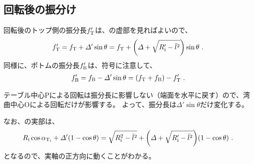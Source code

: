 \subsection{回転後の振分け}
回転後のトップ側の振分長$f_\text T'$は、の虚部を見ればよいので、
\begin{align*}
  f_\text T' = f_\text T+\varDelta'\sin\theta = f_\text T+\left(\varDelta+\sqrt{R_\text i'-\bar l^2}\right)\sin\theta\ .
\end{align*}
同様に、ボトムの振分長$f_\text B'$は、符号に注意して、
\begin{align*}
  f_\text B' = f_\text B-\varDelta'\sin\theta = (f_\text T+f_\text B)-f_\text T'\ .
\end{align*}
\begin{hosokubox}
テーブル中心Pによる回転は振分長に影響しない（端面を水平に戻す）ので、湾曲中心Oによる回転だけが影響する。
よって、振分長は$\varDelta'\sin\theta$だけ変化する。
\end{hosokubox}
なお、の実部は、
\begin{align*}
  R_\text i\cos\alpha_{\text T_\text i}+\varDelta'(1-\cos\theta)
  = \sqrt{R_\text i^2-\bar l^2}+\left(\varDelta+\sqrt{R_\text i'-\bar l^2}\right)\!(1-\cos\theta)\ .
\end{align*}
となるので、実軸の正方向に動くことがわかる。



